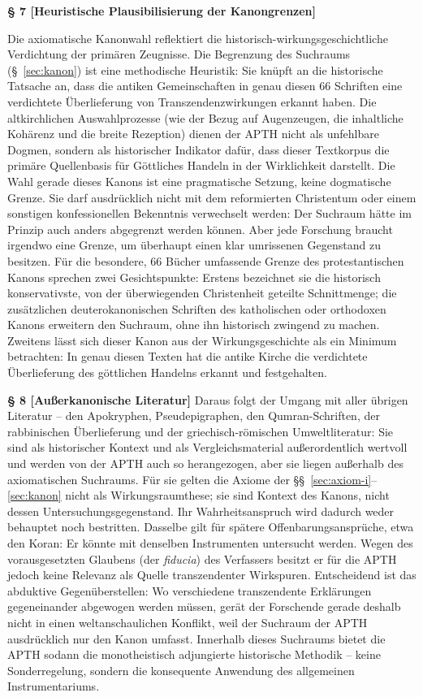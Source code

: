 \documentclass[11pt,a4paper]{article}
\makeatletter
\newcommand{\apth}{{\apthfont APTH}\hspace{0.15em}\xspace}
\newcommand{\apthsec}[3]{%
  \phantomsection%
  \def\@currentlabel{#1}%
  \label{sec:#3}%
  \textbf{§ #1 [#2]}%
}
\makeatother
\begin{document}
\apthsec{7}{Heuristische Plausibilisierung der Kanongrenzen}{kanon-heuristik} 
Die axiomatische Kanonwahl reflektiert die historisch-wirkungsgeschichtliche Verdichtung der primären Zeugnisse. Die Begrenzung des Suchraums (§~\ref{sec:kanon}) ist eine methodische Heuristik: Sie knüpft an die historische Tatsache an, dass die antiken Gemeinschaften in genau diesen 66 Schriften eine verdichtete Überlieferung von Transzendenzwirkungen erkannt haben. Die altkirchlichen Auswahlprozesse (wie der Bezug auf Augenzeugen, die inhaltliche Kohärenz und die breite Rezeption) dienen der \apth nicht als unfehlbare Dogmen, sondern als historischer Indikator dafür, dass dieser Textkorpus die primäre Quellenbasis für Göttliches Handeln in der Wirklichkeit darstellt. Die Wahl gerade dieses Kanons ist eine pragmatische Setzung, keine dogmatische Grenze. Sie darf ausdrücklich nicht mit dem reformierten Christentum oder einem sonstigen konfessionellen Bekenntnis verwechselt werden: Der Suchraum hätte im Prinzip auch anders abgegrenzt werden können. Aber jede Forschung braucht irgendwo eine Grenze, um überhaupt einen klar umrissenen Gegenstand zu besitzen. Für die besondere, 66 Bücher umfassende Grenze des protestantischen Kanons sprechen zwei Gesichtspunkte: Erstens bezeichnet sie die historisch konservativste, von der überwiegenden Christenheit geteilte Schnittmenge; die zusätzlichen deuterokanonischen Schriften des katholischen oder orthodoxen Kanons erweitern den Suchraum, ohne ihn historisch zwingend zu machen. Zweitens lässt sich dieser Kanon aus der Wirkungsgeschichte als ein Minimum betrachten: In genau diesen Texten hat die antike Kirche die verdichtete Überlieferung des göttlichen Handelns erkannt und festgehalten.

\apthsec{8}{Außerkanonische Literatur}{ausserkanonisch} Daraus folgt der Umgang mit aller übrigen Literatur – den Apokryphen, Pseudepigraphen, den Qumran-Schriften, der rabbinischen Überlieferung und der griechisch-römischen Umweltliteratur: Sie sind als historischer Kontext und als Vergleichsmaterial außerordentlich wertvoll und werden von der \apth auch so herangezogen, aber sie liegen außerhalb des axiomatischen Suchraums. Für sie gelten die Axiome der §§~\ref{sec:axiom-i}–\ref{sec:kanon} nicht als Wirkungsraumthese; sie sind Kontext des Kanons, nicht dessen Untersuchungsgegenstand. Ihr Wahrheitsanspruch wird dadurch weder behauptet noch bestritten. Dasselbe gilt für spätere Offenbarungsansprüche, etwa den Koran: Er könnte mit denselben Instrumenten untersucht werden. Wegen des vorausgesetzten Glaubens (der \textit{fiducia}) des Verfassers besitzt er für die \apth jedoch keine Relevanz als Quelle transzendenter Wirkspuren. Entscheidend ist das abduktive Gegenüberstellen: Wo verschiedene transzendente Erklärungen gegeneinander abgewogen werden müssen, gerät der Forschende gerade deshalb nicht in einen weltanschaulichen Konflikt, weil der Suchraum der \apth ausdrücklich nur den Kanon umfasst. Innerhalb dieses Suchraums bietet die \apth sodann die monotheistisch adjungierte historische Methodik – keine Sonderregelung, sondern die konsequente Anwendung des allgemeinen Instrumentariums.
\end{document}

